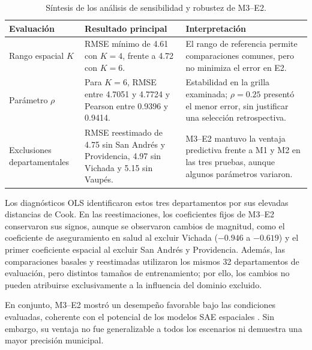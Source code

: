 \begin{table}[!htbp]
\centering
\footnotesize
\caption{Síntesis de los análisis de sensibilidad y robustez de M3--E2.}
\label{tab:discusion-sensibilidad}
\renewcommand{\arraystretch}{1.1}
\setlength{\tabcolsep}{4pt}

\begin{tabularx}{\textwidth}{p{2.7cm} X X}
\toprule
\textbf{Evaluación} &
\textbf{Resultado principal} &
\textbf{Interpretación} \\
\midrule

Rango espacial $K$ &
RMSE mínimo de 4.61 con $K=4$, frente a 4.72 con $K=6$. &
El rango de referencia permite comparaciones comunes, pero no minimiza el error en E2. \\

\addlinespace

Parámetro $\rho$ &
Para $K=6$, RMSE entre 4.7051 y 4.7724 y Pearson entre 0.9396 y 0.9414. &
Estabilidad en la grilla examinada; $\rho=0.25$ presentó el menor error, sin justificar una selección retrospectiva. \\

\addlinespace

Exclusiones departamentales &
RMSE reestimado de 4.75 sin San Andrés y Providencia, 4.97 sin Vichada y 5.15 sin Vaupés. &
M3--E2 mantuvo la ventaja predictiva frente a M1 y M2 en las tres pruebas, aunque algunos parámetros variaron. \\

\bottomrule
\end{tabularx}
\end{table}

Los diagnósticos OLS identificaron estos tres departamentos por sus elevadas distancias de Cook. En las reestimaciones, los coeficientes fijos de M3--E2 conservaron sus signos, aunque se observaron cambios de magnitud, como el coeficiente de aseguramiento en salud al excluir Vichada ($-0.946$ a $-0.619$) y el primer coeficiente espacial al excluir San Andrés y Providencia. Además, las comparaciones basales y reestimadas utilizaron los mismos 32 departamentos de evaluación, pero distintos tamaños de entrenamiento; por ello, los cambios no pueden atribuirse exclusivamente a la influencia del dominio excluido.

En conjunto, M3--E2 mostró un desempeño favorable bajo las condiciones evaluadas, coherente con el potencial de los modelos SAE espaciales \cite{PratesiSalvati_2008,PratesiSalvati_2019}. Sin embargo, su ventaja no fue generalizable a todos los escenarios ni demuestra una mayor precisión municipal.

